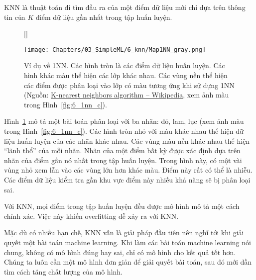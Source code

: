 KNN là thuật toán đi tìm đầu ra của một điểm dữ liệu mới chỉ dựa trên thông tin của $K$ điểm dữ liệu gần nhất trong tập
huấn luyện.
\begin{figure}[t]
[\FBwidth]
{\caption{
Ví dụ về 1NN. Các hình tròn là các điểm dữ liệu huấn luyện. Các hình khác
màu thể hiện các lớp khác nhau. Các vùng nền thể hiện các điểm được phân
loại vào lớp có màu tương ứng khi sử dựng 1NN (Nguồn:
\href{https://en.wikipedia.org/wiki/K-nearest_neighbors_algorithm}{K-nearest
neighbors algorithm  --  Wikipedia}, xem ảnh màu trong Hình~\ref{fig:6_1nn_c}).
}
\label{fig:6_1nn}}
{ %
\texttt{[image: Chapters/03\_SimpleML/6\_knn/Map1NN\_gray.png]}
}
\end{figure}


Hình~\ref{fig:6_1nn} mô tả một bài toán phân loại với ba nhãn: đỏ, lam, lục (xem ảnh màu trong Hình~\ref{fig:6_1nn_c}). Các
hình tròn nhỏ với màu khác nhau thể hiện dữ liệu huấn luyện của các nhãn khác
nhau. Các vùng màu nền khác nhau thể hiện ``lãnh thổ'' của mỗi nhãn. Nhãn của một điểm bất kỳ được xác định dựa trên nhãn của điểm gần nó nhất
trong tập huấn luyện. Trong hình này, có một vài vùng nhỏ xem lẫn vào các
vùng lớn hơn khác màu. Điểm này rất có thể là nhiễu. Các điểm dữ liệu kiểm tra gần khu vực điểm này nhiều khả năng sẽ bị phân loại sai.

Với KNN, mọi điểm trong tập
huấn luyện đều được mô hình mô tả một cách chính xác. Việc này khiến overfitting dễ xảy ra với KNN.

Mặc dù có nhiều hạn chế, KNN vẫn là giải pháp đầu tiên nên nghĩ tới khi giải
quyết một bài toán machine learning. {Khi làm các bài toán machine
learning nói chung, không có mô hình đúng hay sai, chỉ có mô hình cho kết quả
tốt hơn. Chúng ta luôn cần một mô hình đơn giản để giải quyết bài toán, sau đó mới dần tìm cách tăng chất lượng của mô hình.}








